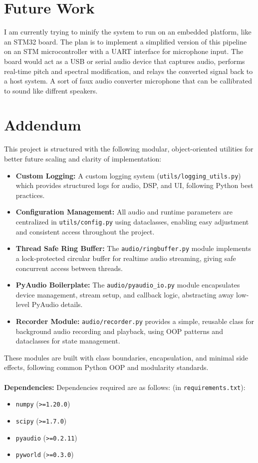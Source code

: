 \documentclass[11pt]{article}
\begin{document}
\section{Future Work}

I am currently trying to minify the system to run on an embedded platform, like an STM32 board. The plan is to implement a simplified version of this pipeline on an STM microcontroller with a UART interface for microphone input. The board would act as a USB or serial audio device that captures audio, performs real-time pitch and spectral modification, and relays the converted signal back to a host system. A sort of faux audio converter microphone that can be callibrated to sound like diffrent speakers.


\pagebreak

\section{Addendum}

This project is structured with the following modular, object-oriented utilities for better future scaling and clarity of implementation:
\begin{itemize}
    \item \textbf{Custom Logging:} A custom logging system (\texttt{utils/logging\_utils.py}) which provides structured logs for audio, DSP, and UI, following Python best practices.
    \item \textbf{Configuration Management:} All audio and runtime parameters are centralized in \texttt{utils/config.py} using dataclasses, enabling easy adjustment and consistent access throughout the project.
    \item \textbf{Thread Safe Ring Buffer:} The \texttt{audio/ringbuffer.py} module implements a lock-protected circular buffer for realtime audio streaming, giving safe concurrent access between threads.
    \item \textbf{PyAudio Boilerplate:} The \texttt{audio/pyaudio\_io.py} module encapsulates device management, stream setup, and callback logic, abstracting away low-level PyAudio details.
    \item \textbf{Recorder Module:} \texttt{audio/recorder.py} provides a simple, reusable class for background audio recording and playback, using OOP patterns and dataclasses for state management.
\end{itemize}
These modules are built with class boundaries, encapsulation, and minimal side effects, following common Python OOP and modularity standards.\\
\\
\textbf{Dependencies:} Dependencies required are as follows: (in \texttt{requirements.txt}):
\begin{itemize}
    \item \texttt{numpy} (\texttt{>=1.20.0})
    \item \texttt{scipy} (\texttt{>=1.7.0})
    \item \texttt{pyaudio} (\texttt{>=0.2.11})
    \item \texttt{pyworld} (\texttt{>=0.3.0})
\end{itemize}
\end{document}
